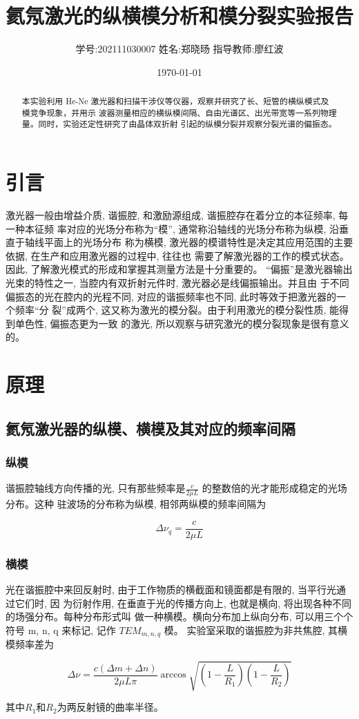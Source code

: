 \documentclass[12pt,a4paper]{article}
\title{\vspace{-4cm}\Large 氦氖激光的纵横模分析和模分裂实验报告}  %
\author{\kaishu 学号:202111030007 \hspace{2cm} 姓名:郑晓旸 \hspace{2cm} 指导教师:廖红波}   %
\date{\today}
\newcommand{\be}[1]{
    \begin{equation}
        #1
    \end{equation}
}
\begin{document}
\maketitle

\begin{abstract}
    本实验利用 He-Ne 激光器和扫描干涉仪等仪器，观察并研究了长、短管的横纵模式及模竞争现象，并用示
波器测量相应的横纵模间隔、自由光谱区、出光带宽等一系列物理量。同时，实验还定性研究了由晶体双折射
引起的纵模分裂并观察分裂光谱的偏振态。
\end{abstract}

\section{引言}
激光器一般由增益介质, 谐振腔, 和激励源组成, 谐振腔存在着分立的本征频率, 每一种本征频
率对应的光场分布称为“模”, 通常称沿轴线的光场分布称为纵模, 沿垂直于轴线平面上的光场分布
称为横模, 激光器的模谱特性是决定其应用范围的主要依据, 在生产和应用激光器的过程中, 往往也
需要了解激光器的工作的模式状态。因此, 了解激光模式的形成和掌握其测量方法是十分重要的。
“偏振”是激光器输出光束的特性之一, 当腔内有双折射元件时, 激光器必是线偏振输出。并且由
于不同偏振态的光在腔内的光程不同, 对应的谐振频率也不同, 此时等效于把激光器的一个频率“分
裂”成两个, 这又称为激光的模分裂。由于利用激光的模分裂性质, 能得到单色性, 偏振态更为一致
的激光, 所以观察与研究激光的模分裂现象是很有意义的。

\section{原理}
\subsection{氦氖激光器的纵模、横模及其对应的频率间隔}
\subsubsection{纵模}
谐振腔轴线方向传播的光, 只有那些频率是$\frac{c}{2\mu L}$
的整数倍的光才能形成稳定的光场分布。这种
驻波场的分布称为纵模, 相邻两纵模的频率间隔为
\be{\Delta \nu_q=\frac{c}{2\mu L}}
\subsubsection{横模}
光在谐振腔中来回反射时, 由于工作物质的横截面和镜面都是有限的, 当平行光通过它们时, 因
为衍射作用, 在垂直于光的传播方向上, 也就是横向, 将出现各种不同的场强分布。每种分布形式叫
做一种横模。横向分布加上纵向分布, 可以用三个个符号 m, n, q 来标记, 记作 $TEM_{m,n,q}$ 模。
实验室采取的谐振腔为非共焦腔, 其横模频率差为
\be{\Delta \nu=\frac{c(\Delta m+\Delta n)}{2\mu L \pi}\arccos{\sqrt{(1-\frac{L}{R_1})(1-\frac{L}{R_2})}}}
其中$R_1$和$R_2$为两反射镜的曲率半径。
\end{document}
